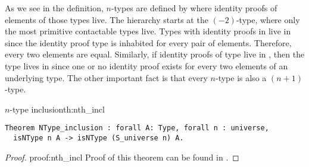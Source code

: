 As we see in the definition, $n$-types are defined by where identity proofs of elements of those types live. The hierarchy starts at the $(-2)$-type, where only the most primitive contactable types live. Types with identity proofs in  live in  since the identity proof type is inhabited for every pair of elements. Therefore, every two elements are equal. Similarly, if identity proofs of type live in , then the type lives in  since one or no identity proof exists for every two elements of an underlying type. The other important fact is that every $n$-type is also a $(n+1)$-type.
\begin{theo}{$n$-type inclusion}{th:nth_incl}
\begin{verbatim}
Theorem NType_inclusion : forall A: Type, forall n : universe,
  isNType n A -> isNType (S_universe n) A.
\end{verbatim}
\end{theo}
\begin{proof}{}{proof:nth_incl}
Proof of this theorem can be found in .
\end{proof}
